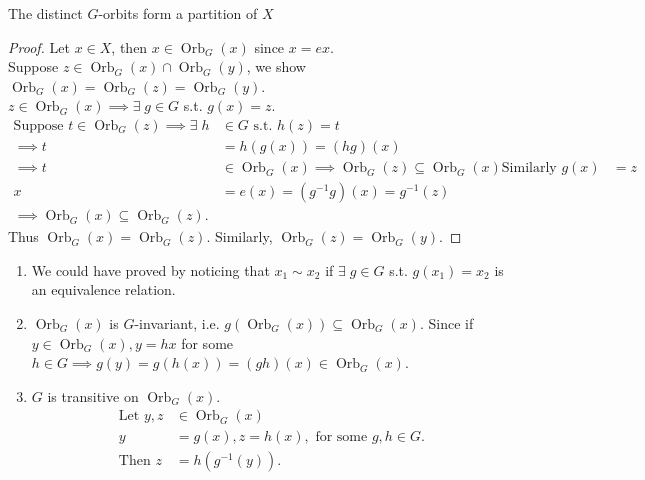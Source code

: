 \begin{lemma} \label{lem:17}
    The distinct $G$-orbits form a partition of $X$
\end{lemma} 

\begin{proof}
    Let $x \in X$, then $x \in \operatorname{Orb}_G(x)$ since $x = ex$. \\
    Suppose $z \in \operatorname{Orb}_G(x) \cap \operatorname{Orb}_G(y)$, we show $\operatorname{Orb}_G(x) = \operatorname{Orb}_G(z) = \operatorname{Orb}_G(y)$. \\
    $z \in \operatorname{Orb}_G(x) \implies \exists \; g \in G$ s.t. $g(x) = z$.
    \begin{align*}
        \text{Suppose } t \in \operatorname{Orb}_G(z) \implies \exists \; h &\in G \text{ s.t. } h(z) = t \\
        \implies t &= h(g(x)) = (hg)(x) \\
        \implies t &\in \operatorname{Orb}_G(x)
        \implies \operatorname{Orb}_G(z) \subseteq \operatorname{Orb}_G(x)
        \text{Similarly } g(x) &= z \\
        x &= e(x) = (g^{-1} g)(x) = g^{-1}(z) \\
        \implies \operatorname{Orb}_G(x) \subseteq \operatorname{Orb}_G(z).
    \end{align*} 
    Thus $\operatorname{Orb}_G(x) = \operatorname{Orb}_G(z)$.
    Similarly, $\operatorname{Orb}_G(z) = \operatorname{Orb}_G(y)$.
\end{proof} 

\begin{remark} \mbox{}
    \begin{enumerate}
        \item We could have proved  by noticing that $x_1 \sim x_2$ if $\exists \; g \in G$ s.t. $g(x_1) = x_2$ is an equivalence relation.
        \item $\operatorname{Orb}_G(x)$ is $G$-invariant, i.e. $g \left( \operatorname{Orb}_G(x) \right) \subseteq \operatorname{Orb}_G(x)$.
        Since if $y \in \operatorname{Orb}_G(x), y = hx$ for some $h \in G \implies g(y) = g(h(x)) = (gh)(x) \in \operatorname{Orb}_G(x)$.
        \item $G$ is transitive on $\operatorname{Orb}_G(x)$.
        \begin{align*}
            \text{Let } y, z &\in \operatorname{Orb}_G(x) \\
            y &= g(x), z = h(x), \text{ for some } g, h \in G. \\
            \text{Then } z &= h(g^{-1}(y)).
        \end{align*} 
    \end{enumerate} 
\end{remark} 

